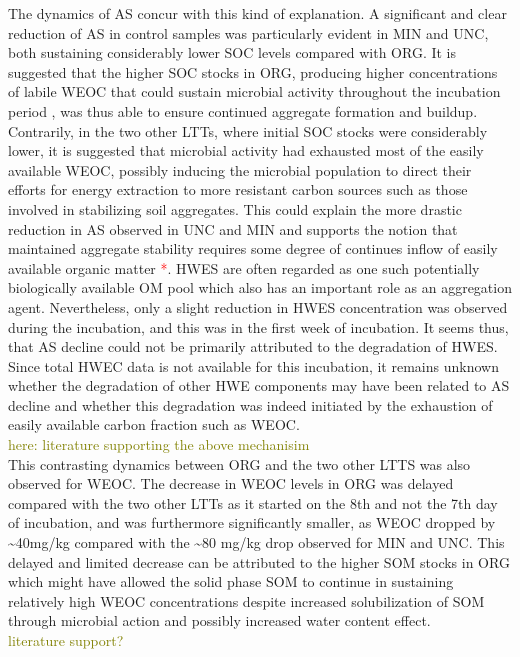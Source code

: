 \documentclass[12pt]{report}
\newcommand{\myRed}[1]{\textcolor{red}{#1}} %
\newcommand{\myGreen}[1]{\textcolor{olive}{#1}} %
\begin{document}
		The dynamics of AS concur with this kind of explanation. A significant and clear reduction of AS in control samples was particularly evident in MIN and UNC, both sustaining considerably lower SOC levels compared with ORG. It is suggested that the higher SOC stocks in ORG, producing higher concentrations of labile WEOC that could sustain microbial activity throughout the incubation period , was thus able to ensure continued aggregate formation and buildup. Contrarily, in the two other LTTs, where initial SOC stocks were considerably lower, it is suggested that microbial activity had exhausted most of the easily available WEOC, possibly inducing the microbial population to direct their efforts for energy extraction to more resistant carbon sources such as those involved in stabilizing soil aggregates. This could explain the more drastic reduction in AS observed in UNC and MIN and supports the notion that maintained aggregate stability requires some degree of continues inflow of easily available organic matter \myRed{*}. HWES are often regarded as one such potentially biologically available OM pool which also has an important role as an aggregation agent. Nevertheless, only a slight reduction in HWES concentration was observed during the incubation, and this was in the first week of incubation. It seems thus, that AS decline could not be primarily attributed to the degradation of HWES. Since total HWEC data is not available for this incubation, it remains unknown whether the degradation of other HWE components may have been related to AS decline and whether this degradation was indeed initiated by  the exhaustion of easily available carbon fraction such as WEOC.\\
		\myGreen{here: literature supporting the above mechanisim}  \citet{cook1992}\\
		\hypertarget{weoc_decrease}{} 
		This contrasting dynamics between ORG and the two other LTTS was also observed for WEOC. The decrease in WEOC levels in ORG was delayed compared with the two other LTTs as it started on the 8th and not the 7th day of incubation, and was furthermore significantly smaller, as WEOC dropped by \~{}40mg/kg compared with the \~{}80 mg/kg drop observed for MIN and UNC. This delayed and limited decrease can be attributed to the higher SOM stocks in ORG which might have allowed the solid phase SOM to continue in sustaining relatively high WEOC concentrations despite increased solubilization of SOM through microbial action and possibly increased water content effect.\\
		\myGreen{literature support?}\\   
\end{document}
